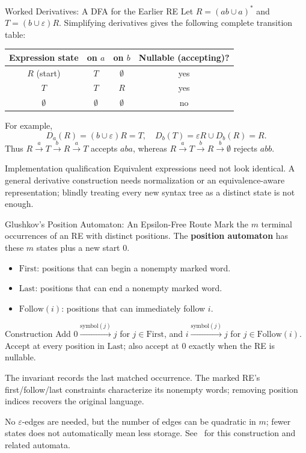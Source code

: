 \documentclass[10pt]{beamer}
\begin{document}
\begin{frame}{Worked Derivatives: A DFA for the Earlier RE}
  \small
  Let $R=(ab\cup a)^*$ and $T=(b\cup\varepsilon)R$.
  Simplifying derivatives gives the following complete transition table:
  \begin{center}
    \begin{tabular}{c|cc|c}
      Expression state & on $a$ & on $b$ & Nullable (accepting)? \\
      \hline
      $R$ (start) & $T$ & $\emptyset$ & yes \\
      $T$ & $T$ & $R$ & yes \\
      $\emptyset$ & $\emptyset$ & $\emptyset$ & no
    \end{tabular}
  \end{center}
  \pause
  For example,
  \[
    D_a(R)=(b\cup\varepsilon)R=T,\quad
    D_b(T)=\varepsilon R\cup D_b(R)=R.
  \]
  Thus $R\xrightarrow{a}T\xrightarrow{b}R\xrightarrow{a}T$ accepts $aba$,
  whereas $R\xrightarrow{a}T\xrightarrow{b}R\xrightarrow{b}\emptyset$
  rejects $abb$.
  \pause
  \begin{alertblock}{Implementation qualification}
    Equivalent expressions need not look identical. A general derivative
    construction needs normalization or an equivalence-aware representation;
    blindly treating every new syntax tree as a distinct state is not enough.
  \end{alertblock}
\end{frame}

\begin{frame}{Glushkov's Position Automaton: An Epsilon-Free Route}
  \small
  Mark the $m$ terminal occurrences of an RE with distinct positions.
  The \textbf{position automaton} has these $m$ states plus a new start $0$.
  \begin{itemize}
    \item $\mathrm{First}$: positions that can begin a nonempty marked word.
    \item $\mathrm{Last}$: positions that can end a nonempty marked word.
    \item $\mathrm{Follow}(i)$: positions that can immediately follow $i$.
  \end{itemize}
  \pause
  \begin{block}{Construction}
    Add $0\xrightarrow{\mathrm{symbol}(j)}j$ for $j\in\mathrm{First}$,
    and $i\xrightarrow{\mathrm{symbol}(j)}j$ for
    $j\in\mathrm{Follow}(i)$. Accept at every position in $\mathrm{Last}$;
    also accept at $0$ exactly when the RE is nullable.
  \end{block}
  \pause
  The invariant records the last matched occurrence. The marked RE's
  first/follow/last constraints characterize its nonempty words; removing
  position indices recovers the original language.
  \par\smallskip
  No $\varepsilon$-edges are needed, but the number of edges can be quadratic
  in $m$; fewer states does not automatically mean less storage.
  See~\cite{allauzen-mohri} for this construction and related automata.
\end{frame}
\end{document}
